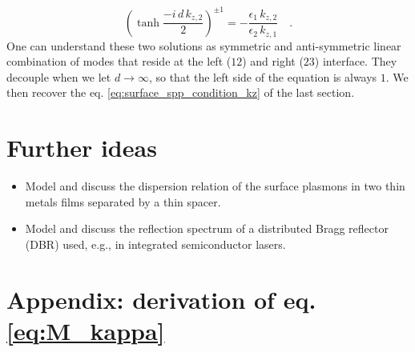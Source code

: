 \begin{equation}
 \left( \tanh\frac{ -i \, d \, k_{z,2}  }{2} \right)^{\pm 1} = - \frac{ \epsilon_1 \, k_{z,2}  }{ \epsilon_2 \, k_{z,1} } \quad . 
\end{equation} 
One can understand these two solutions as symmetric and anti-symmetric linear combination of modes that reside at the left ($12$)  and right ($23$) interface. They decouple when we let $d \rightarrow \infty$, so that the left side of the equation is always $1$.  We then recover the eq. \ref{eq:surface_spp_condition_kz} of the last section.





\section{Further ideas}

\begin{itemize}
\item Model and discuss the dispersion relation of the surface plasmons in two thin metals films separated by a thin spacer.

\item Model and discuss the reflection spectrum of  a distributed Bragg reflector (DBR) used, e.g., in integrated semiconductor lasers.
\end{itemize}


\section{Appendix: derivation of eq. \ref{eq:M_kappa}}


